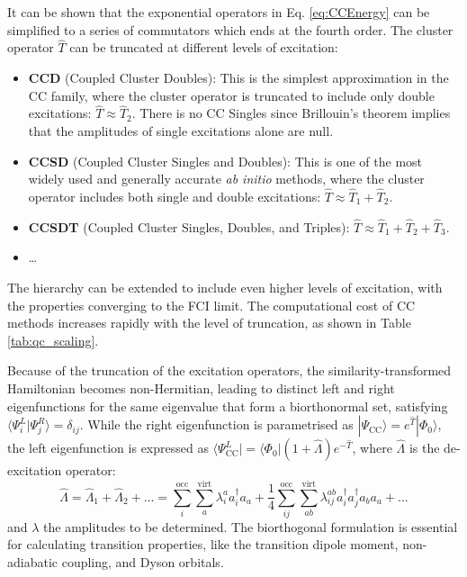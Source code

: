 It can be shown that the exponential operators in Eq. \ref{eq:CCEnergy} can be simplified to a series of commutators which ends at the fourth order. The cluster operator $\hat{T}$ can be truncated at different levels of excitation:
\begin{itemize}
    \item \textbf{CCD} (Coupled Cluster Doubles): This is the simplest approximation in the CC family, where the cluster operator is truncated to include only double excitations: $\hat{T} \approx \hat{T}_2$. There is no CC Singles since Brillouin's theorem implies that the amplitudes of single excitations alone are null. 
    \item \textbf{CCSD} (Coupled Cluster Singles and Doubles): This is one of the most widely used and generally accurate \textit{ab initio} methods, where the cluster operator includes both single and double excitations: $\hat{T} \approx \hat{T}_1 + \hat{T}_2$.
    \item \textbf{CCSDT} (Coupled Cluster Singles, Doubles, and Triples): $\hat{T} \approx \hat{T}_1 + \hat{T}_2 + \hat{T}_3$.
    \item \ldots
\end{itemize}
The hierarchy can be extended to include even higher levels of excitation,  with the properties converging to the FCI limit. The computational cost of CC methods increases rapidly with the level of truncation, as shown in Table \ref{tab:qc_scaling}.

Because of the truncation of the excitation operators, the similarity-transformed Hamiltonian becomes non-Hermitian, leading to distinct left and right eigenfunctions for the same eigenvalue that form a biorthonormal set, satisfying $\langle \Psi_i^L | \Psi_j^R \rangle = \delta_{ij}$. While the right eigenfunction is parametrised as $|\Psi_{\text{CC}}\rangle = e^{\hat{T}}|\Phi_0\rangle$, the left eigenfunction is expressed as $\langle\Psi_{\text{CC}}^L| = \langle\Phi_0|(1 + \hat{\Lambda})e^{-\hat{T}}$, where $\hat{\Lambda}$ is the de-excitation operator:
\begin{equation}\label{eq:Lambda}
    \hat{\Lambda} = \hat{\Lambda}_1 + \hat{\Lambda}_2 + ... = \sum_i^{\text{occ}}\sum_a^{\text{virt}} \lambda_i^a a_i^{\dagger}a_a + \frac{1}{4}\sum_{ij}^{\text{occ}}\sum_{ab}^{\text{virt}} \lambda_{ij}^{ab}a_i^{\dagger}a_j^{\dagger}a_b a_a + ...
\end{equation}
and $\lambda$ the amplitudes to be determined. The biorthogonal formulation is essential for calculating transition properties, like the transition dipole moment, non-adiabatic coupling, and Dyson orbitals.
\iffalse  by solving the linear equations:
\begin{equation}
        \langle\Phi_0|(1 + \hat{\Lambda})e^{-\hat{T}}[\hat{H},\tau_{\mu}]e^{\hat{T}}|\Phi_0\rangle = 0
\end{equation}
where $\tau_{\mu}$ represents an excitation operator\fi

